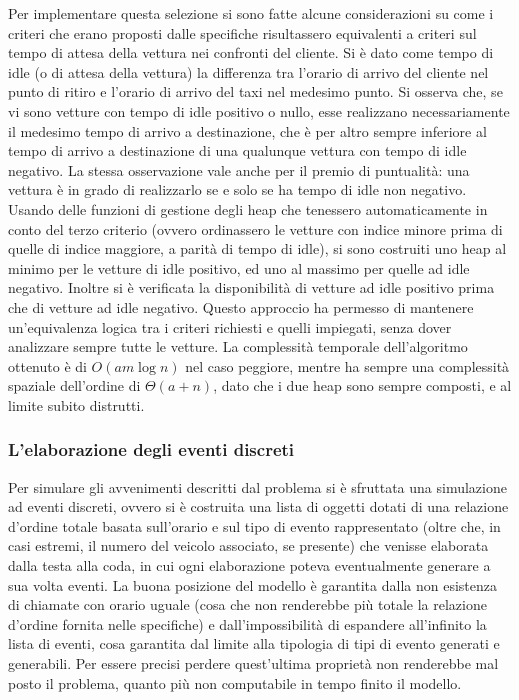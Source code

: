 \documentclass[a4paper,11pt]{Article}
\begin{document}
Per implementare questa selezione si sono fatte alcune considerazioni su come i criteri che erano proposti dalle specifiche risultassero equivalenti a criteri sul tempo di attesa della vettura nei confronti del cliente.
Si è dato come tempo di idle (o di attesa della vettura) la differenza tra l'orario di arrivo del cliente nel punto di ritiro e l'orario di arrivo del taxi nel medesimo punto.
Si osserva che, se vi sono vetture con tempo di idle positivo o nullo, esse realizzano necessariamente il medesimo tempo di arrivo a destinazione, che è per altro sempre inferiore al tempo di arrivo a destinazione di una qualunque vettura con tempo di idle negativo. La stessa osservazione vale anche per il premio di puntualità: una vettura è in grado di realizzarlo se e solo se ha tempo di idle non negativo.
Usando delle funzioni di gestione degli heap che tenessero automaticamente in conto del terzo criterio (ovvero ordinassero le vetture con indice minore prima di quelle di indice maggiore, a parità di tempo di idle), si sono costruiti uno heap al minimo per le vetture di idle positivo, ed uno al massimo per quelle ad idle negativo.
Inoltre si è verificata la disponibilità di vetture ad idle positivo prima che di vetture ad idle negativo. Questo approccio ha permesso di mantenere un'equivalenza logica tra i criteri richiesti e quelli impiegati, senza dover analizzare sempre tutte le vetture. La complessità temporale dell'algoritmo ottenuto è di $O(am\log{n})$ nel caso peggiore, mentre ha sempre una complessità spaziale dell'ordine di $\Theta(a + n)$, dato che i due heap sono sempre composti, e al limite subito distrutti.

\subsubsection{L'elaborazione degli eventi discreti}
Per simulare gli avvenimenti descritti dal problema si è sfruttata una simulazione ad eventi discreti, ovvero si è costruita una lista di oggetti dotati di una relazione d'ordine totale basata sull'orario e sul tipo di evento rappresentato (oltre che, in casi estremi, il numero del veicolo associato, se presente) che venisse elaborata dalla testa alla coda, in cui ogni elaborazione poteva eventualmente generare a sua volta eventi.
La buona posizione del modello è garantita dalla non esistenza di chiamate con orario uguale (cosa che non renderebbe più totale la relazione d'ordine fornita nelle specifiche) e dall'impossibilità di espandere all'infinito la lista di eventi, cosa garantita dal limite alla tipologia di tipi di evento generati e generabili. Per essere precisi perdere quest'ultima proprietà non renderebbe mal posto il problema, quanto più non computabile in tempo finito il modello.
\end{document}
